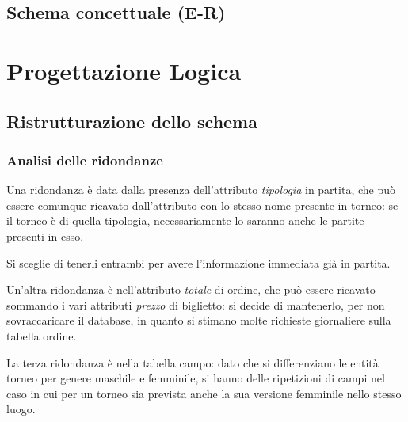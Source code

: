 \documentclass[10pt]{article}
\newcommand{\spazia}{\par\medskip}
\begin{document}
\subsection{Schema concettuale (E-R)}
\begin{figure}[h]
\end{figure}

\section{Progettazione Logica}

\subsection{Ristrutturazione dello schema}

\subsubsection{Analisi delle ridondanze}

Una ridondanza è data dalla presenza dell'attributo \textit{tipologia} in partita, che può essere comunque ricavato dall'attributo con lo stesso nome presente in torneo: se il torneo è di quella tipologia, necessariamente lo saranno anche le partite presenti in esso.

Si sceglie di tenerli entrambi per avere l'informazione immediata già in partita.
\spazia

Un'altra ridondanza è nell'attributo \textit{totale} di ordine, che può essere ricavato sommando i vari attributi \textit{prezzo} di biglietto: si decide di mantenerlo, per non sovraccaricare il database, in quanto si stimano molte richieste giornaliere sulla tabella ordine.\spazia

La terza ridondanza è nella tabella campo: dato che si differenziano le entità torneo per genere maschile e femminile, si hanno delle ripetizioni di campi nel caso in cui per un torneo sia prevista anche la sua versione femminile nello stesso luogo. 
\end{document}
